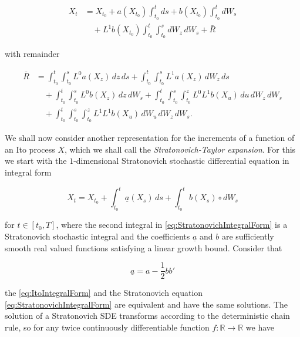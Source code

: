\begin{equation} \label{eq:HigherOrderExpansion}
\begin{split}
    X_t &= X_{t_0} + a(X_{t_0}) \int_{t_0}^t ds + b(X_{t_0}) \int_{t_0}^t dW_s \\
    &\quad + L^1 b(X_{t_0}) \int_{t_0}^t \int_{t_0}^s dW_z \, dW_s + \bar{R}
\end{split}
\end{equation}

\noindent with remainder

\begin{equation} \label{eq:SecondRemainder}
\begin{split}
    \bar{R} &= \int_{t_0}^t \int_{t_0}^s L^0 a(X_z) \, dz \, ds + \int_{t_0}^t \int_{t_0}^s L^1 a(X_z) \, dW_z \, ds \\
    &\quad + \int_{t_0}^t \int_{t_0}^s L^0 b(X_z) \, dz \, dW_s + \int_{t_0}^t \int_{t_0}^s \int_{t_0}^z L^0 L^1 b(X_u) \, du \, dW_z \, dW_s \\
    &\quad + \int_{t_0}^t \int_{t_0}^s \int_{t_0}^z L^1 L^1 b(X_u) \, dW_u \, dW_z \, dW_s.
\end{split}
\end{equation}

\noindent We shall now consider another representation for the increments of a function of an Ito process $X$, which we shall call the \textit{Stratonovich-Taylor expansion}. For this we start with the $1$-dimensional Stratonovich stochastic differential equation in integral form

\begin{equation} \label{eq:StratonovichIntegralForm}
    X_t = X_{t_0} + \int_{t_0}^t \underline{a}(X_s) \, ds + \int_{t_0}^t b(X_s) \circ dW_s
\end{equation}

\noindent for $t \in [t_0, T]$, where the second integral in \eqref{eq:StratonovichIntegralForm} is a Stratonovich stochastic integral and the coefficients $\underline{a}$ and $b$ are sufficiently smooth real valued functions satisfying a linear growth bound. Consider that

\begin{equation*}
    \underline{a} = a - \frac{1}{2} bb'
\end{equation*}

\noindent the \cref{eq:ItoIntegralForm} and the Stratonovich equation \eqref{eq:StratonovichIntegralForm} are equivalent and have the same solutions. The solution of a Stratonovich SDE transforms according to the deterministic chain rule, so for any twice continuously differentiable function $f : \mathbb{R} \to \mathbb{R}$ we have

